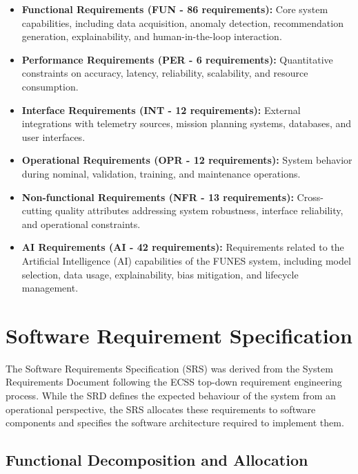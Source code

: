 \begin{itemize}
    \item \textbf{Functional Requirements (FUN - 86 requirements):} Core system capabilities, including data acquisition, anomaly detection, recommendation generation, explainability, and human-in-the-loop interaction.
    
    \item \textbf{Performance Requirements (PER - 6 requirements):} Quantitative constraints on accuracy, latency, reliability, scalability, and resource consumption.
    
    \item \textbf{Interface Requirements (INT - 12 requirements):} External integrations with telemetry sources, mission planning systems, databases, and user interfaces.
    
    \item \textbf{Operational Requirements (OPR - 12 requirements):} System behavior during nominal, validation, training, and maintenance operations.
    
    \item \textbf{Non-functional Requirements (NFR - 13 requirements):} Cross-cutting quality attributes addressing system robustness, interface reliability, and operational constraints.
    
    \item \textbf{AI Requirements (AI - 42 requirements):} Requirements related to the Artificial Intelligence (AI) capabilities of the FUNES system, including model selection, data usage, explainability, bias mitigation, and lifecycle management.
\end{itemize}




\section{Software Requirement Specification}
The Software Requirements Specification (SRS) was derived from the System Requirements Document following the ECSS top-down requirement engineering process. While the SRD defines the expected behaviour of the system from an operational perspective, the SRS allocates these requirements to software components and specifies the software architecture required to implement them.



\subsection{Functional Decomposition and Allocation}

